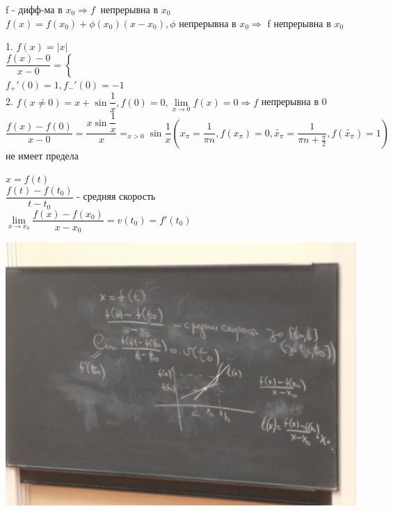 \begin{properties}
	f - дифф-ма в $x_0 \Rightarrow f \ $ непрерывна в $x_0 $ \\
	$ f(x) = f(x_0) + \phi(x_0) (x - x_0), \phi $ непрерывна в $x_0 \Rightarrow $ f непрерывна в $x_0$ \\
	\begin{example}
		1. $ f(x) = |x| $ \\
		$ \dfrac{f(x) - 0}{x - 0} = \left\{ \right. $ \\
		$ f_+' (0) = 1, f_-' (0) = -1 $ \\
		2. $ f(x \neq 0) = x + \sin \dfrac{1}{x}, f(0) = 0, \lim\limits_{x \rightarrow 0} f(x) = 0 \Rightarrow f  $ непрерывна в 0 \\
		$ \dfrac{f(x) - f(0)}{x-0} = \dfrac{x \sin \dfrac{1}{x}}{x} =_{x>0} \sin \dfrac{1}{x} (x_{\pi} = \dfrac{1}{\pi n}, f(x_{\pi}) = 0, \tilde{x_{\pi}} =  \dfrac{1}{\pi n + \frac{\pi}{2}}, f(  \tilde{x_{\pi}} ) = 1  ) $ не имеет предела
	\end{example}   
\end{properties}



$ x = f(t) $ \\
$ \dfrac{f(t) - f(t_0)}{t - t_0} $ - средняя скорость \\
$ \lim\limits_{x \rightarrow x_0} \dfrac{f(x) - f(x_0)}{x - x_0} = v(t_0) = f'(t_0) $ \\
\begin{center}
	\includegraphics[width=0.9\linewidth]{IMG_20181119_124128}
\end{center}


